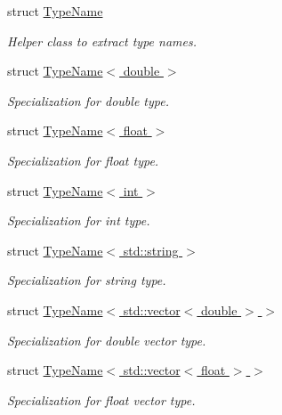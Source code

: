 \begin{DoxyCompactItemize}
\item 
struct \hyperlink{struct_d_d4hep_1_1_d_d_segmentation_1_1_type_name}{Type\+Name}
\begin{DoxyCompactList}\small\item\em Helper class to extract type names. \end{DoxyCompactList}\item 
struct \hyperlink{struct_d_d4hep_1_1_d_d_segmentation_1_1_type_name_3_01double_01_4}{Type\+Name$<$ double $>$}
\begin{DoxyCompactList}\small\item\em Specialization for double type. \end{DoxyCompactList}\item 
struct \hyperlink{struct_d_d4hep_1_1_d_d_segmentation_1_1_type_name_3_01float_01_4}{Type\+Name$<$ float $>$}
\begin{DoxyCompactList}\small\item\em Specialization for float type. \end{DoxyCompactList}\item 
struct \hyperlink{struct_d_d4hep_1_1_d_d_segmentation_1_1_type_name_3_01int_01_4}{Type\+Name$<$ int $>$}
\begin{DoxyCompactList}\small\item\em Specialization for int type. \end{DoxyCompactList}\item 
struct \hyperlink{struct_d_d4hep_1_1_d_d_segmentation_1_1_type_name_3_01std_1_1string_01_4}{Type\+Name$<$ std\+::string $>$}
\begin{DoxyCompactList}\small\item\em Specialization for string type. \end{DoxyCompactList}\item 
struct \hyperlink{struct_d_d4hep_1_1_d_d_segmentation_1_1_type_name_3_01std_1_1vector_3_01double_01_4_01_4}{Type\+Name$<$ std\+::vector$<$ double $>$ $>$}
\begin{DoxyCompactList}\small\item\em Specialization for double vector type. \end{DoxyCompactList}\item 
struct \hyperlink{struct_d_d4hep_1_1_d_d_segmentation_1_1_type_name_3_01std_1_1vector_3_01float_01_4_01_4}{Type\+Name$<$ std\+::vector$<$ float $>$ $>$}
\begin{DoxyCompactList}\small\item\em Specialization for float vector type. \end{DoxyCompactList}\item 

\end{DoxyCompactItemize}
